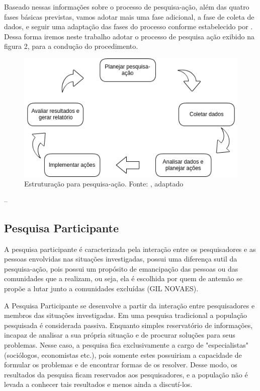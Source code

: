 Baseado nessas informações sobre o processo de pesquisa-ação, além das quatro fases básicas previstas, vamos adotar mais uma fase adicional, a fase de coleta de dados, e seguir uma adaptação das fases do processo conforme estabelecido por . Dessa forma iremos neste trabalho adotar o processo de pesquisa ação exibido na figura 2, para a condução do procedimento.

\begin{figure}[!htb]
	\centering
	\includegraphics[scale=0.6]{figuras/estruturacao_pesquisa_acao}
	\caption{Estruturação para pesquisa-ação. Fonte: \cite{coughlan2002action}, adaptado}
\end{figure}
--
\newpage

\subsection{Pesquisa Participante}
A pesquisa participante é caracterizada pela interação entre os pesquisadores e as pessoas envolvidas nas situações investigadas, possui uma diferença sutil da pesquisa-ação, pois possui um propósito de emancipação das pessoas ou das comunidades que a realizam, ou seja, ela é escolhida por quem de antemão se propõe a lutar junto a comunidades excluídas (GIL NOVAES).

A Pesquisa Participante se desenvolve a partir da interação entre pesquisadores e membros das situações investigadas. Em uma pesquisa tradicional a população pesquisada é considerada passiva. Enquanto simples reservatório de informações, incapaz de analisar a sua própria situação e de procurar soluções para seus problemas. Nesse  caso, a pesquisa fica exclusivamente a cargo de "especialistas" (sociólogos, economistas etc.), pois somente estes possuiriam a capacidade de formular os problemas e de encontrar formas de os resolver. Desse modo, os resultados da pesquisa ficam reservados aos pesquisadores, e a  população não é levada a conhecer tais resultados e menos ainda a discutí-los.

